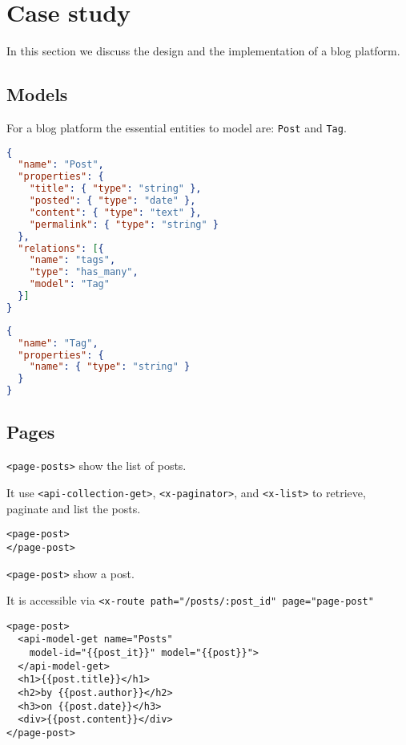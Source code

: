 \section{Case study}
In this section we discuss the design and the implementation of a blog platform. 

\subsection{Models}

For a blog platform the essential entities to model are: \texttt{Post} and \texttt{Tag}.

\begin{lstlisting}[language=json]
{
  "name": "Post",
  "properties": {
    "title": { "type": "string" },
    "posted": { "type": "date" },
    "content": { "type": "text" },
    "permalink": { "type": "string" }
  }, 
  "relations": [{
    "name": "tags", 
    "type": "has_many", 
    "model": "Tag"
  }]
}
\end{lstlisting}

\begin{lstlisting}[language=json]
{
  "name": "Tag",
  "properties": {
    "name": { "type": "string" }
  }
}
\end{lstlisting}


\subsection{Pages}

\texttt{<page-posts>} show the list of posts.

It use \texttt{<api-collection-get>}, \texttt{<x-paginator>}, and \texttt{<x-list>} to retrieve, paginate and list the posts.

\begin{lstlisting}[language=HTML5]
<page-post>
</page-post>
\end{lstlisting}

\texttt{<page-post>} show a post. 

It is accessible via \texttt{<x-route path="/posts/:post\_id" page="page-post"}

\begin{lstlisting}[language=HTML5]
<page-post>
  <api-model-get name="Posts" 
    model-id="{{post_it}}" model="{{post}}">
  </api-model-get>
  <h1>{{post.title}}</h1>
  <h2>by {{post.author}}</h2>
  <h3>on {{post.date}}</h3>
  <div>{{post.content}}</div>
</page-post>
\end{lstlisting}
